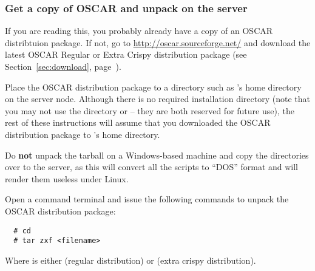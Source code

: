 \subsubsection{Get a copy of OSCAR and unpack on the server} 
\label{det:unpack}

If you are reading this, you probably already have a copy of an OSCAR
distribtuion package.  If not, go to
\url{http://oscar.sourceforge.net/} and download the latest OSCAR
Regular or Extra Crispy distribution package (see
Section~\ref{sec:download}, page~\pageref{sec:download}).

Place the OSCAR distribution package to a directory such as
's home directory on the server node.  Although there is no
required installation directory (note that you may not use the
directory  or  -- they are
both reserved for future use), the rest of these instructions will
assume that you downloaded the OSCAR distribution package to
's home directory.

Do {\bf not} unpack the tarball on a Windows-based machine and copy
the directories over to the server, as this will convert all the
scripts to ``DOS'' format and will render them useless under Linux.

Open a command terminal and issue the following commands to unpack the
OSCAR distribution package:

\begin{verbatim}
  # cd
  # tar zxf <filename>
\end{verbatim}

Where  is either
 (regular distribution) or
 (extra crispy
distribution).

\def\obase{$^\sim$/oscar-\oscarversion}

